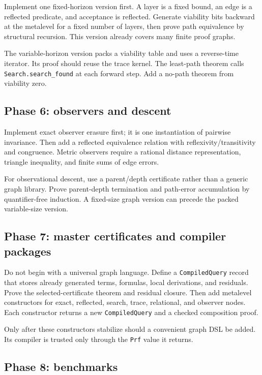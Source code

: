 Implement one fixed-horizon version first.  A layer is a fixed bound, an edge is a reflected predicate, and acceptance is reflected.  Generate viability bits backward at the metalevel for a fixed number of layers, then prove path equivalence by structural recursion.  This version already covers many finite proof graphs.

The variable-horizon version packs a viability table and uses a reverse-time iterator.  Its proof should reuse the trace kernel.  The least-path theorem calls \texttt{Search.search\_found} at each forward step.  Add a no-path theorem from viability zero.

\subsection{Phase 6: observers and descent}

Implement exact observer erasure first; it is one instantiation of pairwise invariance.  Then add a reflected equivalence relation with reflexivity/transitivity and congruence.  Metric observers require a rational distance representation, triangle inequality, and finite sums of edge errors.

For observational descent, use a parent/depth certificate rather than a generic graph library.  Prove parent-depth termination and path-error accumulation by quantifier-free induction.  A fixed-size graph version can precede the packed variable-size version.

\subsection{Phase 7: master certificates and compiler packages}

Do not begin with a universal graph language.  Define a \texttt{CompiledQuery} record that stores already generated terms, formulas, local derivations, and residuals.  Prove the selected-certificate theorem and residual closure.  Then add metalevel constructors for exact, reflected, search, trace, relational, and observer nodes.  Each constructor returns a new \texttt{CompiledQuery} and a checked composition proof.

Only after these constructors stabilize should a convenient graph DSL be added.  Its compiler is trusted only through the \texttt{Prf} value it returns.

\subsection{Phase 8: benchmarks}

